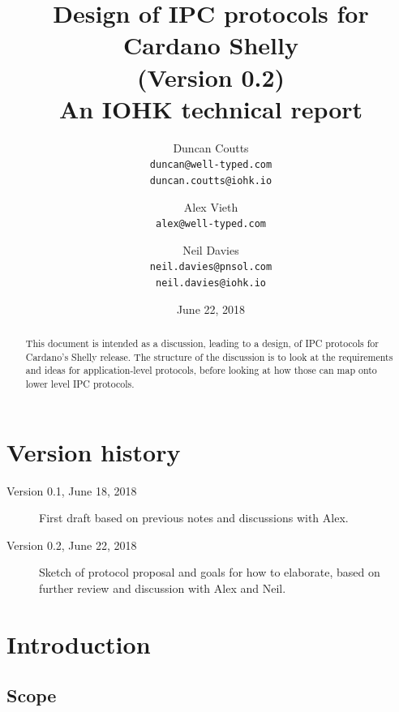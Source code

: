 \documentclass{article}
\theoremstyle{definition}{
  \newtheorem{lemma}{Lemma}[section] %
  \newtheorem{definition}[lemma]{Definition}
}
\theoremstyle{theorem}{
  \newtheorem{invariant}[lemma]{Invariant}
  \newtheorem{proofobligation}[lemma]{Proof Obligation}
}
\numberwithin{equation}{lemma}
\begin{document}
\title{Design of IPC protocols for Cardano Shelly \\
       {\small (Version 0.2)} \\
       {\large \sc An IOHK technical report}}
\author{Duncan Coutts \\ {\small \texttt{duncan@well-typed.com}} \\
                         {\small \texttt{duncan.coutts@iohk.io}}
   \and Alex Vieth \\ {\small \texttt{alex@well-typed.com}}
   \and Neil Davies \\ {\small \texttt{neil.davies@pnsol.com}} \\
                       {\small \texttt{neil.davies@iohk.io}}
   }
\date{June 22, 2018}

\maketitle

\begin{abstract}
This document is intended as a discussion, leading to a design, of IPC
protocols for Cardano's Shelly release. The structure of the discussion is to
look at the requirements and ideas for application-level protocols, before
looking at how those can map onto lower level IPC protocols.
\end{abstract}

\tableofcontents

\section*{Version history}

\begin{description}
\item[Version 0.1, June 18, 2018] First draft based on previous notes and
                                  discussions with Alex.
\item[Version 0.2, June 22, 2018] Sketch of protocol proposal and goals for
                                  how to elaborate, based on further review
                                  and discussion with Alex and Neil.
\end{description}

\section{Introduction}

\subsection{Scope}
\end{document}
